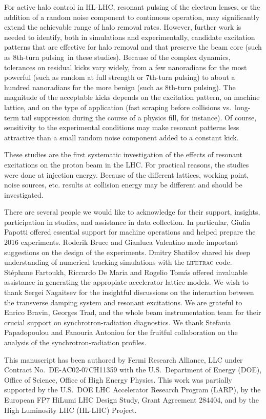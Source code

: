\documentclass[aps
,prstab
,reprint
,longbibliography
,preprintnumbers
,showkeys
,amsfonts,amssymb,amsmath
,floatfix
]{revtex4-1}
\newcommand{\code}[1]{\textsc{#1}} %
\newcommand{\seventhtp}{7th-turn pulsing}
\newcommand{\eighthtp}{8th-turn pulsing}
\begin{document}
For active halo control in HL-LHC, resonant pulsing of the electron
lenses, or the addition of a random noise component to continuous
operation, may significantly extend the achievable range of halo
removal rates. However, further work is needed to identify, both in
simulations and experimentally, candidate excitation patterns that are
effective for halo removal and that preserve the beam core (such as
\eighthtp\ in these studies). Because of the complex dynamics,
tolerances on residual kicks vary widely, from a few nanoradians for
the most powerful (such as random at full strength or \seventhtp) to
about a hundred nanoradians for the more benign (such as
\eighthtp). The magnitude of the acceptable kicks depends on the
excitation pattern, on machine lattice, and on the type of application
(fast scraping before collisions vs.\ long-term tail suppression
during the course of a physics fill, for instance). Of course,
sensitivity to the experimental conditions may make resonant patterns
less attractive than a small random noise component added to a
constant kick.

These studies are the first systematic investigation of the effects of
resonant excitations on the proton beam in the LHC.  For practical
reasons, the studies were done at injection energy. Because of the
different lattices, working point, noise sources, etc. results at
collision energy may be different and should be investigated.


\begin{acknowledgments}
  There are several people we would like to acknowledge for their
  support, insights, participation in studies, and assistance in data
  collection. In particular, Giulia Pa\-potti offered essential
  support for machine operations and helped prepare the 2016
  experiments. Roderik Bruce and Gianluca Va\-len\-ti\-no made
  important suggestions on the design of the experiments. Dmitry
  Sha\-ti\-lov shared his deep understanding of numerical tracking
  simulations with the \code{lifetrac} code. St\'{e}\-phane
  Far\-toukh, Ric\-car\-do De Maria and Ro\-ge\-lio Tom\'{a}s offered
  invaluable assistance in generating the appropiate accelerator
  lattice models. We wish to thank Sergei Na\-gai\-tsev for the
  insightful discussions on the interaction between the transverse
  damping system and resonant excitations. We are grateful to
  En\-ri\-co Bra\-vin, Georges Trad, and the whole beam
  instrumentation team for their crucial support on
  synchrotron-radiation diagnostics. We thank Ste\-fania
  Pa\-pa\-do\-pou\-lou and Fa\-nou\-ria An\-to\-niou for the fruitful
  collaboration on the analysis of the synchrotron-radiation profiles.

  This manuscript has been authored by Fermi Research Alliance,
  LLC under Contract No.~DE-AC02-07CH11359 with the U.S.\ Department
  of Energy (DOE), Office of Science, Office of High Energy
  Physics. This work was partially supported by the U.S.\ DOE LHC
  Accelerator Research Program (LARP), by the European FP7 HiLumi LHC
  Design Study, Grant Agreement 284404, and by the High Luminosity LHC
  (HL-LHC) Project.
\end{acknowledgments}



\end{document}
